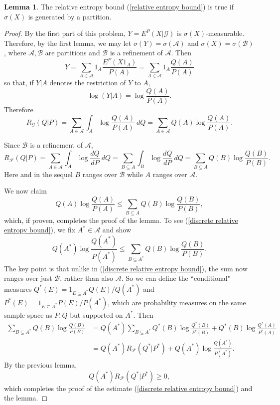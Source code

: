 \documentclass[10pt]{article}
\theoremstyle{definition}
\newtheorem{lemma}{Lemma}[exer]
\begin{document}
\begin{lemma}
The relative entropy bound (\ref{relative entropy bound}) is true if $\sigma(X)$ is generated by a partition.
\end{lemma}
\begin{proof}
By the first part of this problem, $Y = E^P(X|\mathcal G)$ is $\sigma(X)$-measurable.
Therefore, by the first lemma, we may let $\sigma(Y) = \sigma(\mathcal A)$ and $\sigma(X) = \sigma(\mathcal B)$, where $\mathcal A, \mathcal B$ are partitions and $\mathcal B$ is a refinement of $\mathcal A$.
Then
$$Y = \sum_{A \in \mathcal A} 1_A \frac{E^P(X1_A)}{P(A)} = \sum_{A \in \mathcal A} 1_A \frac{Q(A)}{P(A)}$$
so that, if $Y|A$ denotes the restriction of $Y$ to $A$,
$$\log(Y|A) = \log \frac{Q(A)}{P(A)}.$$
Therefore
$$R_{\mathcal G}(Q|P) = \sum_{A \in \mathcal A} \int_A \log \frac{Q(A)}{P(A)} ~dQ = \sum_{A \in \mathcal A} Q(A) \log \frac{Q(A)}{P(A)}.$$

Since $\mathcal B$ is a refinement of $\mathcal A$,
$$R_{\mathcal F}(Q|P) = \sum_{A \in \mathcal A} \int_A \log \frac{dQ}{dP} ~dQ
= \sum_{B \subseteq A} \int_B \log \frac{dQ}{dP} ~dQ = \sum_{B \subseteq A} Q(B) \log \frac{Q(B)}{P(B)}.$$
Here and in the sequel $B$ ranges over $\mathcal B$ while $A$ ranges over $\mathcal A$.

We now claim
\begin{equation}
\label{discrete relative entropy bound}
Q(A) \log \frac{Q(A)}{P(A)} \leq \sum_{B \subseteq A} Q(B) \log \frac{Q(B)}{P(B)},
\end{equation}
which, if proven, completes the proof of the lemma.
To see (\ref{discrete relative entropy bound}), we fix $A^* \in \mathcal A$ and show
$$Q(A^*) \log \frac{Q(A^*)}{P(A^*)} \leq \sum_{B \subseteq A^*} Q(B) \log \frac{Q(B)}{P(B)}.$$
The key point is that unlike in (\ref{discrete relative entropy bound}), the sum now ranges over just $\mathcal B$, rather than also $\mathcal A$.
So we can define the ``conditional" measures $Q^*(E) = 1_{E \subseteq A^*}Q(E)/Q(A^*)$ and $P^*(E) = 1_{E \subseteq A^*}P(E)/P(A^*)$, which are probability measures on the same sample space as $P,Q$ but supported on $A^*$.
Then
\begin{align*}
\sum_{B \subseteq A^*} Q(B) \log \frac{Q(B)}{P(B)} &= Q(A^*) \sum_{B \subseteq A^*} Q^*(B) \log \frac{Q^*(B)}{P^*(B)} + Q^*(B) \log \frac{Q^*(A)}{P^*(A)}\\
&= Q(A^*) R_{\mathcal F}(Q^*|P^*) + Q(A^*) \log \frac{Q(A^*)}{P(A^*)}.
\end{align*}
By the previous lemma,
$$Q(A^*) R_{\mathcal F}(Q^*|P^*) \geq 0,$$
which completes the proof of the estimate (\ref{discrete relative entropy bound}) and the lemma.
\end{proof}
\end{document}
